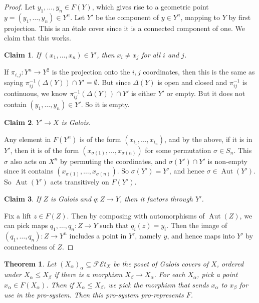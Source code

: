 \documentclass{shortart}
\newtheorem*{thm}{Theorem}
\newtheorem*{claim}{Claim}
\theoremstyle{definition}
\newcommand\FEt[1]{\mathscr{FE}t_{#1}}
\DeclareMathOperator\Aut{Aut}
\begin{document}
\begin{proof}\leavevmode
  Let $y_1, \ldots, y_n \in F(Y)$, which gives rise to a geometric point $y = (y_1, \ldots, y_n) \in Y^n$. Let $Y'$ be the component of $y \in Y^n$, mapping to $Y$ by first projection. This is an \'etale cover since it is a connected component of one. We claim that this works.
  
  \begin{claim}
    If $(x_1, \ldots, x_n) \in Y'$, then $x_i \not= x_j$ for all $i$ and $j$.
  \end{claim}
  If $\pi_{i, j}: Y^n \to Y^2$ is the projection onto the $i, j$ coordinates, then this is the same as saying $\pi_{ij}^{-1}(\Delta(Y)) \cap Y' = \emptyset$. But since $\Delta(Y)$ is open and closed and $\pi_{ij}^{-1}$ is continuous, we know $\pi_{ij}^{-1}(\Delta(Y)) \cap Y'$ is either $Y'$ or empty. But it does not contain $(y_1, \ldots, y_n) \in Y'$. So it is empty.

  \begin{claim}
    $Y' \to X$ is Galois.
  \end{claim}
  Any element in $F(Y^n)$ is of the form $(x_{i_1}, \ldots, x_{i_n})$, and by the above, if it is in $Y'$, then it is of the form $(x_{\sigma(1)}, \ldots, x_{\sigma(n)})$ for some permutation $\sigma \in S_n$. This $\sigma$ also acts on $X^n$ by permuting the coordinates, and $\sigma(Y') \cap Y'$ is non-empty since it contains $(x_{\sigma(1)}, \ldots, x_{\sigma(n)})$. So $\sigma(Y') = Y'$, and hence $\sigma \in \Aut(Y')$. So $\Aut(Y')$ acts transitively on $F(Y')$.

  \begin{claim}
    If $Z$ is Galois and $q: Z \to Y$, then it factors through $Y'$.
  \end{claim}

  Fix a lift $z \in F(Z)$. Then by composing with automorphisms of $\Aut(Z)$, we can pick maps $q_1, \ldots, q_n: Z \to Y$ such that $q_i(z) = y_i$. Then the image of $(q_1, \ldots, q_n): Z \to Y^n$ includes a point in $Y'$, namely $y$, and hence maps into $Y'$ by connectedness of $Z$.
\end{proof}


\begin{thm}
  Let $(X_\alpha)_\alpha \subseteq \FEt{X}$ be the poset of Galois covers of $X$, ordered under $X_\alpha \leq X_\beta$ if there is a morphism $X_\beta \to X_\alpha$. For each $X_\alpha$, pick a point $x_\alpha \in F(X_\alpha)$. Then if $X_\alpha \leq X_\beta$, we pick the morphism that sends $x_\alpha$ to $x_\beta$ for use in the pro-system. Then this pro-system pro-represents $F$.
\end{thm}
\end{document}

